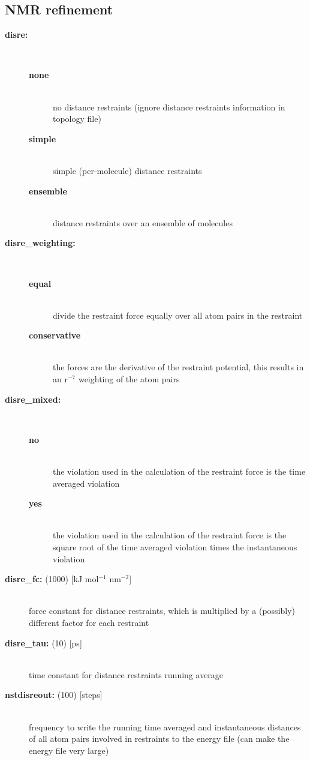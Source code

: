 \subsection{ NMR refinement}
\begin{description}
\item[{\bf disre:}]\mbox{}\\
\vspace{-2ex}\begin{description}
\item[{\bf none}]\mbox{}\\
no distance restraints (ignore distance restraints information in
topology file)
\item[{\bf simple}]\mbox{}\\
simple (per-molecule) distance restraints
\item[{\bf ensemble}]\mbox{}\\
distance restraints over an ensemble of molecules
\end{description}
\item[{\bf disre\_weighting:}]\mbox{}\\
\vspace{-2ex}\begin{description}
\item[{\bf equal}]\mbox{}\\
divide the restraint force equally over all atom pairs in the restraint
\item[{\bf conservative}]\mbox{}\\
the forces are the derivative of the restraint potential,
this results in an r$^{-7}$ weighting of the atom pairs
\end{description}
\item[{\bf disre\_mixed:}]\mbox{}\\
\vspace{-2ex}\begin{description}
\item[{\bf no}]\mbox{}\\
the violation used in the calculation of the restraint force is the
time averaged violation 
\item[{\bf yes}]\mbox{}\\
the violation used in the calculation of the restraint force is the
square root of the time averaged violation times the instantaneous violation 
\end{description}
\item[{\bf disre\_fc: }(1000) {[kJ mol$^{-1}$ nm$^{-2}$]}]\mbox{}\\
force constant for distance restraints, which is multiplied by a
(possibly) different factor for each restraint
\item[{\bf disre\_tau: }(10) {[ps]}]\mbox{}\\
time constant for distance restraints running average
\item[{\bf nstdisreout: }(100) {[steps]}]\mbox{}\\
frequency to write the running time averaged and instantaneous distances
of all atom pairs involved in restraints to the energy file
(can make the energy file very large)
\end{description}

